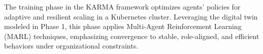\documentclass[conference]{IEEEtran}
\begin{document}

The training phase in the KARMA framework optimizes agents’ policies for adaptive and resilient scaling in a Kubernetes cluster. Leveraging the digital twin modeled in Phase 1, this phase applies Multi-Agent Reinforcement Learning (MARL) techniques, emphasizing convergence to stable, role-aligned, and efficient behaviors under organizational constraints.
\end{document}
